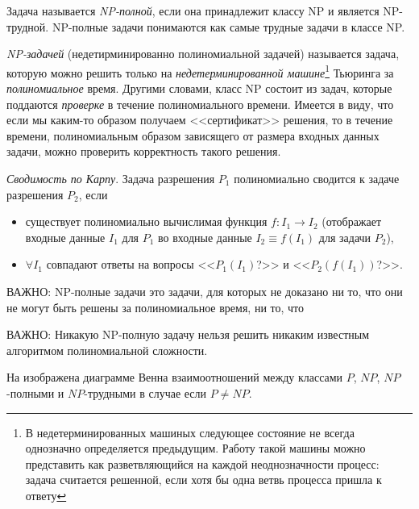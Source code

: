 \documentclass[%
	11pt,
	a4paper,
	utf8,
		]{article}
\begin{document}
Задача называется \emph{NP-полной}, если она принадлежит классу NP и является NP-трудной. NP-полные задачи понимаются как самые трудные задачи в классе NP.

\emph{NP-задачей} (недетирминированно полиномиальной задачей) называется задача, которую можно решить только на \emph{недетерминированной машине}\footnote{В недетерминированных машиных следующее состояние не всегда однозначно определяется предыдущим. Работу такой машины можно представить как разветвляющийся на каждой неоднозначности процесс: задача считается решенной, если хотя бы одна ветвь процесса пришла к ответу} Тьюринга за \emph{полиномиальное} время. Другими словами, класс NP состоит из задач, которые поддаются \emph{проверке} в течение полиномиального времени. Имеется в виду, что если мы каким-то образом получаем <<сертификат>> решения, то в течение времени, полиномиальным образом зависящего от размера входных данных задачи, можно проверить корректность такого решения.


\emph{Сводимость по Карпу}. Задача разрешения $ P_1 $ полиномиально сводится к задаче разрешения $ P_2 $, если
\begin{itemize}
	\item существует полиномиально вычислимая функция $ f: I_1 \to I_2 $ (отображает входные данные $ I_1 $ для $ P_1 $ во входные данные $ I_2 \equiv f(I_1) $ для задачи $ P_2 $),
	
	\item $ \forall I_1 $ совпадают ответы на вопросы <<$ P_1(I_1) $?>> и <<$ P_2(f(I_1)) $?>>.
\end{itemize} 

ВАЖНО: NP-полные задачи это задачи, для которых не доказано ни то, что они не могут быть решены за полиномиальное время, ни то, что 

ВАЖНО: Никакую NP-полную задачу нельзя решить никаким известным алгоритмом полиномиальной сложности.

На  изображена диаграмме Венна взаимоотношений между классами $ P $, $ NP $, $ NP $-полными и $ NP $-трудными в случае если $ P \neq NP $.
\end{document}

